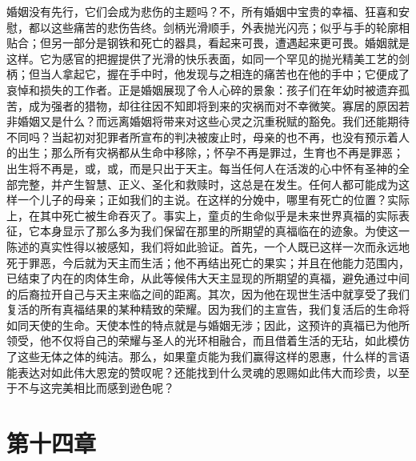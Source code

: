 婚姻没有先行，它们会成为悲伤的主题吗？不，所有婚姻中宝贵的幸福、狂喜和安慰，都以这些痛苦的悲伤告终。剑柄光滑顺手，外表抛光闪亮；似乎与手的轮廓相贴合；但另一部分是钢铁和死亡的器具，看起来可畏，遭遇起来更可畏。婚姻就是这样。它为感官的把握提供了光滑的快乐表面，如同一个罕见的抛光精美工艺的剑柄；但当人拿起它，握在手中时，他发现与之相连的痛苦也在他的手中；它便成了哀悼和损失的工作者。正是婚姻展现了令人心碎的景象：孩子们在年幼时被遗弃孤苦，成为强者的猎物，却往往因不知即将到来的灾祸而对不幸微笑。寡居的原因若非婚姻又是什么？而远离婚姻将带来对这些心灵之沉重税赋的豁免。我们还能期待不同吗？当起初对犯罪者所宣布的判决被废止时，母亲的也不再，也没有预示着人的出生；那么所有灾祸都从生命中移除，；怀孕不再是罪过，生育也不再是罪恶；出生将不再是，或，或，而是只出于天主。每当任何人在活泼的心中怀有圣神的全部完整，并产生智慧、正义、圣化和救赎时，这总是在发生。任何人都可能成为这样一个儿子的母亲；正如我们的主说。在这样的分娩中，哪里有死亡的位置？实际上，在其中死亡被生命吞灭了。事实上，童贞的生命似乎是未来世界真福的实际表征，它本身显示了那么多为我们保留在那里的所期望的真福临在的迹象。为使这一陈述的真实性得以被感知，我们将如此验证。首先，一个人既已这样一次而永远地死于罪恶，今后就为天主而生活；他不再结出死亡的果实；并且在他能力范围内，已结束了内在的肉体生命，从此等候伟大天主显现的所期望的真福，避免通过中间的后裔拉开自己与天主来临之间的距离。其次，因为他在现世生活中就享受了我们复活的所有真福结果的某种精致的荣耀。因为我们的主宣告，我们复活后的生命将如同天使的生命。天使本性的特点就是与婚姻无涉；因此，这预许的真福已为他所领受，他不仅将自己的荣耀与圣人的光环相融合，而且借着生活的无玷，如此模仿了这些无体之体的纯洁。那么，如果童贞能为我们赢得这样的恩惠，什么样的言语能表达对如此伟大恩宠的赞叹呢？还能找到什么灵魂的恩赐如此伟大而珍贵，以至于不与这完美相比而感到逊色呢？\par


\section{第十四章}

